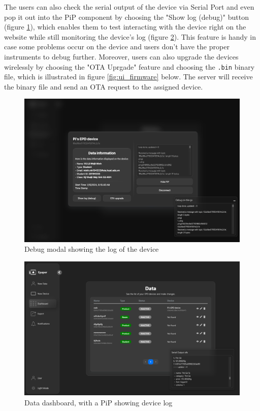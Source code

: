 \documentclass[../Main.tex]{subfiles}
\begin{document}
The users can also check the serial output of the device via Serial Port and even pop it out into the PiP component by choosing the "Show log (debug)" button (figure \ref{fig:ui_debug}), which enables them to test interacting with the device right on the website while still monitoring the device's log (figure \ref{fig:data-dashboard}). This feature is handy in case some problems occur on the device and users don't have the proper instruments to debug further. Moreover, users can also upgrade the devices wirelessly by choosing the "OTA Uprgade" feature and choosing the \verb|.bin| binary file, which is illustrated in figure \ref{fig:ui_firmware} below. The server will receive the binary file and send an OTA request to the assigned device.

\begin{figure}[H]
    \centering
    \includegraphics[width=0.85\linewidth]{doc//imgs/ui_debug.png}
    \caption{Debug modal showing the log of the device}
    \label{fig:ui_debug}
\end{figure}

\begin{figure}[H]
        \centering
        \includegraphics[width=0.85\linewidth]{doc//imgs/ui_data-dashboard.png}
        \caption{Data dashboard, with a PiP showing device log}
        \label{fig:data-dashboard}
\end{figure}
\end{document}
